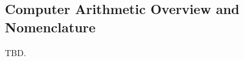\subsection{Computer Arithmetic Overview and Nomenclature}
\label{cldd0:snom0:scan0}

TBD.

%
%
%
%
%

